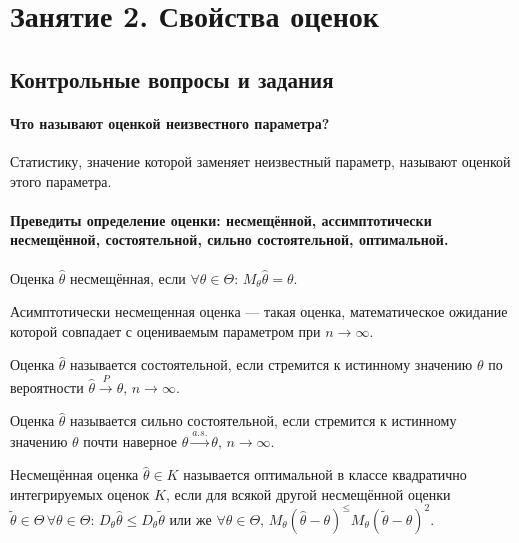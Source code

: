 \chapter*{Занятие 2. Свойства оценок}

\section*{Контрольные вопросы и задания}

\subsubsection*{Что называют оценкой неизвестного параметра?}

Статистику, значение которой заменяет неизвестный параметр, называют оценкой этого параметра.

\subsubsection*{Преведиты определение оценки: несмещённой, ассимптотически несмещённой,
                состоятельной, сильно состоятельной, оптимальной.}

Оценка $ \hat{ \theta}$  несмещённая,
если $ \forall \theta \in \Theta: \, M_{ \theta } \hat{ \theta } = \theta $.

Асимптотически несмещенная оценка --- такая оценка,
математическое ожидание которой совпадает с оцениваемым параметром при $n \to \infty $.

Оценка $ \hat{ \theta }$ называется состоятельной,
если стремится к истинному значению $ \theta $ по вероятности
$ \hat{ \theta } \overset{P}{ \rightarrow } \theta, \,
  n \to \infty $.

Оценка $ \hat{ \theta }$ называется сильно состоятельной,
если стремится к истинному значению $ \theta $ почти наверное
$ \hat{ \theta } \overset{a.s.}{ \rightarrow } \theta, \,
  n \to \infty $.

Несмещённая оценка $ \hat{ \theta } \in K$
называется оптимальной в классе квадратично интегрируемых оценок $K$,
если для всякой другой несмещённой оценки
$ \tilde{ \theta } \in \Theta \,
  \forall \theta \in \Theta: \,
  D_{ \theta } \hat{ \theta } \leq D_{ \theta } \tilde{ \theta }$
или же
$ \forall \theta \in \Theta, \,
  M_{ \theta } \left( \hat{ \theta } - \theta \right)^ \leq
  M_{ \theta } \left( \tilde{ \theta } - \theta \right)^2$.

